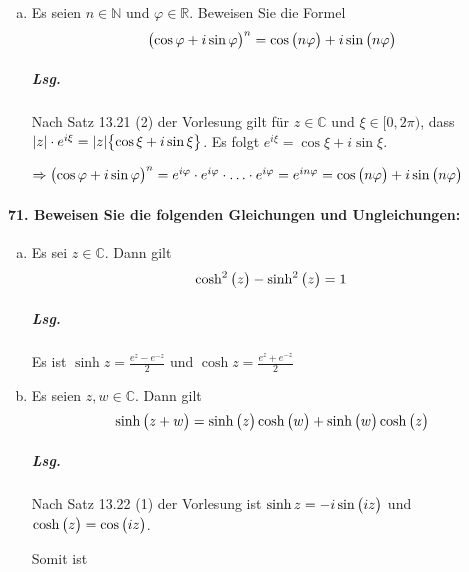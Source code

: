 \documentclass{scrreprt}
\begin{document}
\begin{enumerate}[(a)]
\item Es seien $n \in \mathbb{N}$ und $\varphi \in \mathbb{R}$.
  Beweisen Sie die Formel
  \[
    \qty\big(\cos \varphi + i \sin \varphi)^n = \cos\qty\big(n\varphi) + i \sin\qty\big(n\varphi)
  \]

  \subparagraph{Lsg.} Nach Satz 13.21 (2) der Vorlesung gilt für
  $z \in \mathbb{C}$ und $\xi \in \big[0, 2\pi \big)$, dass
  $\abs{z} \cdot e^{i\xi} = \abs{z}\qty\big{\cos\xi + i\sin\xi}$.
  Es folgt $e^{i\xi} = \cos\xi + i\sin\xi$.

  $\Rightarrow \qty\big(\cos \varphi + i \sin \varphi)^n =
  e^{i\varphi} \cdot e^{i\varphi} \cdot \ldots \cdot e^{i\varphi}
  = e^{in\varphi} = \cos\qty\big(n\varphi) + i\sin\qty\big(n\varphi)$
\end{enumerate}

\newpage
\paragraph{71. Beweisen Sie die folgenden Gleichungen und Ungleichungen:}

\begin{enumerate}[(a)]
\item Es sei $z \in \mathbb{C}$.
  Dann gilt
  \[
    \cosh^2\qty\big(z) - \sinh^2\qty\big(z) = 1
  \]

  \subparagraph{Lsg.} Es ist $\sinh z = \frac{e^z - e^{-z}}{2}$ und
  $\cosh z = \frac{e^z + e^{-z}}{2}$

\item Es seien $z, w \in \mathbb{C}$.
  Dann gilt
  \[
    \sinh\qty\big(z + w) = \sinh\qty\big(z)\cosh\qty\big(w) + \sinh\qty\big(w)\cosh\qty\big(z)
  \]

  \subparagraph{Lsg.} Nach Satz 13.22 (1) der Vorlesung ist
  $\sinh z = -i\sin\qty\big(iz)$ und $\cosh\qty\big(z) = \cos\qty\big(iz)$.

  Somit ist
\end{enumerate}
\end{document}

